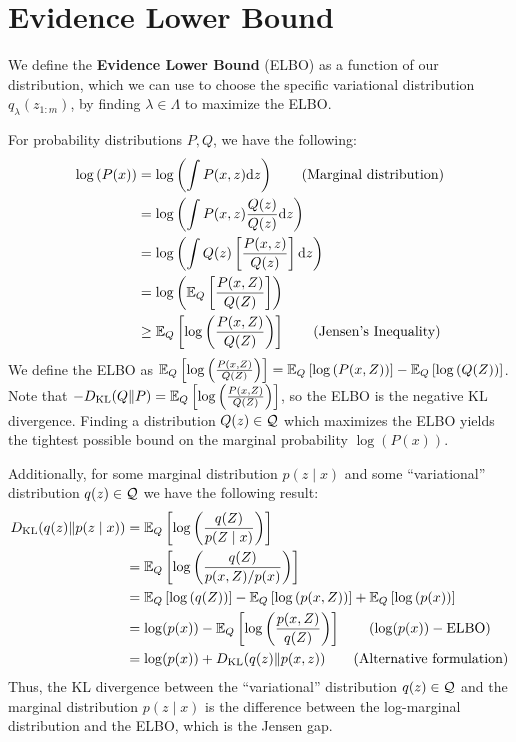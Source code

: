 \documentclass[11pt]{article}
\numberwithin{figure}{section}
\numberwithin{equation}{section}
\begin{document}
\section{Evidence Lower Bound}
We define the \textbf{Evidence Lower Bound} (ELBO) as a function of our distribution, which we can use to choose the specific variational distribution $q_{\lambda}(z_{1:m})$, by finding $\lambda \in \Lambda$ to maximize the ELBO. 

For probability distributions $P, Q$, we have the following: 
\begin{align*}
    \log\left(P(x)\right) &= \log\left(\int P(x, z)\textrm{d}z\right) \tag{Marginal distribution}\\
    &= \log\left(\int P(x, z)\frac{Q(z)}{Q(z)}\textrm{d}z\right)\\
    &= \log\left(\int Q(z)\left[\frac{P(x,z)}{Q(z)}\right]\textrm{d}z\right)\\
    &= \log\left(\expec[Q]{\frac{P(x, Z)}{Q(Z)}}\right)\\
    &\ge \expec[Q]{\log\left(\frac{P(x, Z)}{Q(Z)}\right)} \tag{Jensen's Inequality}
\end{align*}
We define the ELBO as $\expec[Q]{\log\left(\frac{P(x, Z)}{Q(Z)}\right)} = \expec[Q]{\log\left({P(x, Z)}\right)} - \expec[Q]{\log\left({Q(Z)}\right)}$. Note that $-\KLdiv{Q}{P} = \expec[Q]{\log\left(\frac{P(x, Z)}{Q(Z)}\right)}$, so the ELBO is the negative KL divergence. Finding a distribution $Q(z) \in \calQ$ which maximizes the ELBO yields the tightest possible bound on the marginal probability $\log(P(x))$. 

Additionally, for some marginal distribution $p(z \mid x)$ and some ``variational'' distribution $q(z) \in \calQ$ we have the following result:
\begin{align*}
    \KLdiv{q(z)}{p(z \mid x)} &= \expec[Q]{\log\left(\frac{q(Z)}{p(Z \mid x)}\right)}\\
    &= \expec[Q]{\log\left(\frac{q(Z)}{p(x, Z)/p(x)}\right)}\\
    &= \expec[Q]{\log\left({q(Z)}\right)} - \expec[Q]{\log\left({p(x, Z)}\right)} + \expec[Q]{\log\left({p(x)}\right)}\\
    &= \log(p(x)) - \expec[Q]{\log\left(\frac{p(x, Z)}{q(Z)}\right)} \tag{$\log(p(x)) - \textrm{ELBO}$}\\
    &= \log(p(x)) + \KLdiv{q(z)}{p(x, z)} \tag{Alternative formulation}
\end{align*}
Thus, the KL divergence between the ``variational'' distribution $q(z) \in \calQ$ and the marginal distribution $p(z \mid x)$ is the difference between the log-marginal distribution and the ELBO, which is the Jensen gap.
\end{document}
